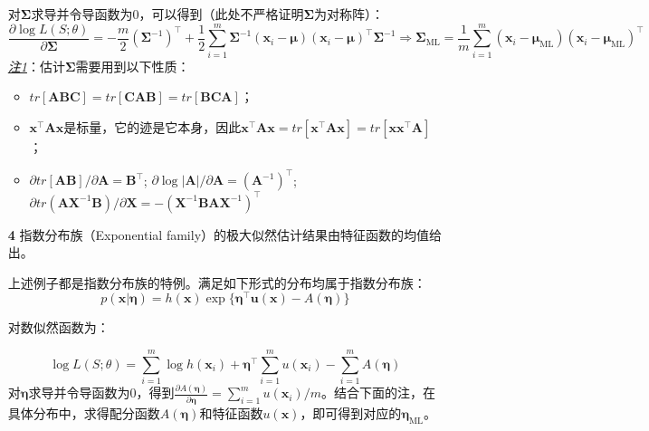 \documentclass{article}
\begin{document}
\begin{itemize}
\begin{scriptsize}
\begin{spacing}{1.2}
{	对$\bm{\Sigma}$求导并令导函数为0，可以得到（此处不严格证明$\bm{\Sigma}$为对称阵）：
	\begin{equation*}
	\frac{\partial \log L(S;\theta)}{\partial \bm{\Sigma}} = -\frac{m}{2} (\bm{\Sigma}^{-1})^\top + \frac{1}{2} \sum_{i=1}^m  \bm{\Sigma}^{-1} (\bm{x}_i - \bm{\mu})(\bm{x}_i - \bm{\mu})^\top \bm{\Sigma}^{-1} \Rightarrow \bm{\Sigma}_{\mathrm{ML}} = \frac{1}{m}\sum_{i=1}^m (\bm{x}_i - \bm{\mu}_{\mathrm{ML}})(\bm{x}_i - \bm{\mu}_{\mathrm{ML}})^\top
	\end{equation*}
	\textit{\underline{注1}}：估计$\bm{\Sigma}$需要用到以下性质：	
	\begin{itemize}
	\item $tr[\bm{A}\bm{B}\bm{C}]=tr[\bm{C}\bm{A}\bm{B}]=tr[\bm{B}\bm{C}\bm{A}]$；
	\item $\bm{x}^\top \bm{A} \bm{x}$是标量，它的迹是它本身，因此$\bm{x}^\top \bm{A} \bm{x} = tr[\bm{x}^\top \bm{A} \bm{x}] = tr[\bm{x} \bm{x}^\top \bm{A}]$；
	\item $\partial tr[\bm{A} \bm{B}]/\partial \bm{A} = \bm{B}^\top$; $\partial \log |\bm{A}|/\partial \bm{A} = (\bm{A}^{-1})^\top$; $\partial tr(\bm{A}\bm{X}^{-1}\bm{B})/\partial \bm{X} = -(\bm{X}^{-1} \bm{BA}\bm{X}^{-1})^\top$
	\end{itemize}
	}
	\end{spacing}
	\end{scriptsize}
	\vspace{-2mm}
	
	\item [\textbf{4}] 指数分布族（Exponential family）的极大似然估计结果由特征函数的均值给出。
	
	上述例子都是指数分布族的特例。满足如下形式的分布均属于指数分布族：
	\begin{equation}
	p(\bm{x}|\bm{\eta}) = h(\bm{x}) \exp\{ \bm{\eta}^\top \bm{u}(\bm{x}) - A(\bm{\eta}) \}
	\end{equation}

	\begin{scriptsize}
	\begin{spacing}{1.2}
	{\sffamily

	对数似然函数为：
	
	\begin{equation*}
	\log L(S;\theta) = \sum_{i=1}^m \log h(\bm{x}_i) + \bm{\eta}^\top \sum_{i=1}^m u(\bm{x}_i) - \sum_{i=1}^m A(\bm{\eta})
	\end{equation*}
对$\bm{\eta}$求导并令导函数为0，得到$\frac{\partial A(\bm{\eta})}{\partial \bm{\eta}} = \sum_{i=1}^m u(\bm{x}_i)/m$。结合下面的注，在具体分布中，求得配分函数$A(\bm{\eta})$和特征函数$u(\bm{x})$，即可得到对应的$\bm{\eta}_\mathrm{ML}$。
	
}
\end{spacing}
\end{scriptsize}
\end{itemize}
\end{document}
